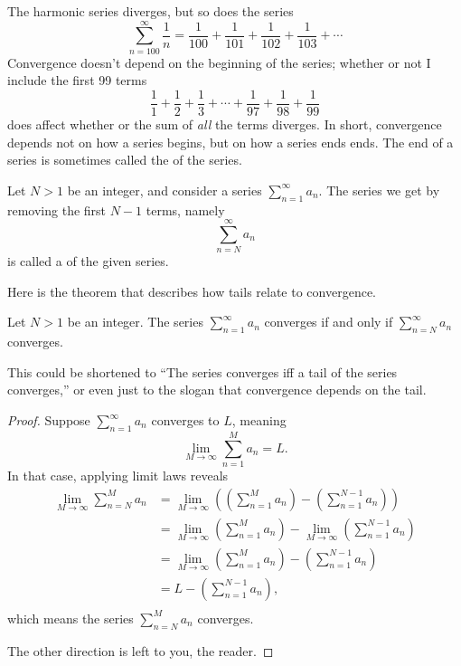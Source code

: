 \nobreak The harmonic series diverges, but so does the series
\[
\sum_{n=100}^\infty \frac{1}{n} = \frac{1}{100} + \frac{1}{101} + \frac{1}{102} + \frac{1}{103} + \cdots
\]
Convergence doesn't depend on the beginning of the series; whether or not I include the first 99 terms
\[
\frac{1}{1} + \frac{1}{2} + \frac{1}{3} + \cdots + \frac{1}{97} + \frac{1}{98} + \frac{1}{99}
\]
does affect whether or the sum of \textit{all} the terms diverges.  In
short, convergence depends not on how a series begins, but on how a
series ends ends.  The end of a series is sometimes called the
 of the series.

\begin{definition}
  Let $N > 1$ be an integer, and consider a series $\sum_{n=1}^\infty a_n$.  The series we get by removing the first $N-1$ terms, namely
\[
\sum_{n=N}^\infty a_n
\]
is called a  of the given series.
\end{definition}

Here is the theorem that describes how tails relate to convergence.
\begin{theorem}\label{thm:convergence-for-tails}
  Let $N > 1$ be an integer.  The series $\sum_{n=1}^\infty a_n$ converges if and only if $\sum_{n=N}^\infty a_n$ converges.
\end{theorem}
This could be shortened to ``The series converges iff a tail of the
series converges,'' or even just to the slogan that convergence
depends on the tail.
\begin{proof}
  Suppose $\sum_{n=1}^\infty a_n$ converges to $L$, meaning
\[
\lim_{M \to \infty} \sum_{n=1}^M a_n = L.
\]
In that case, applying limit laws reveals
\begin{align*}
\lim_{M \to \infty} \sum_{n=N}^M a_n
&= \lim_{M \to \infty} \left( \left( \sum_{n=1}^M a_n \right) - \left( \sum_{n=1}^{N-1} a_n \right) \right) \\
&= \lim_{M \to \infty} \left( \sum_{n=1}^M a_n \right) - \lim_{M \to \infty} \left( \sum_{n=1}^{N-1} a_n \right) \\
&= \lim_{M \to \infty} \left( \sum_{n=1}^M a_n \right) - \left( \sum_{n=1}^{N-1} a_n \right) \\
&= L - \left( \sum_{n=1}^{N-1} a_n \right), \\
\end{align*}
which means the series $\sum_{n=N}^M a_n$ converges.

The other direction is left to you, the reader.
\end{proof}

